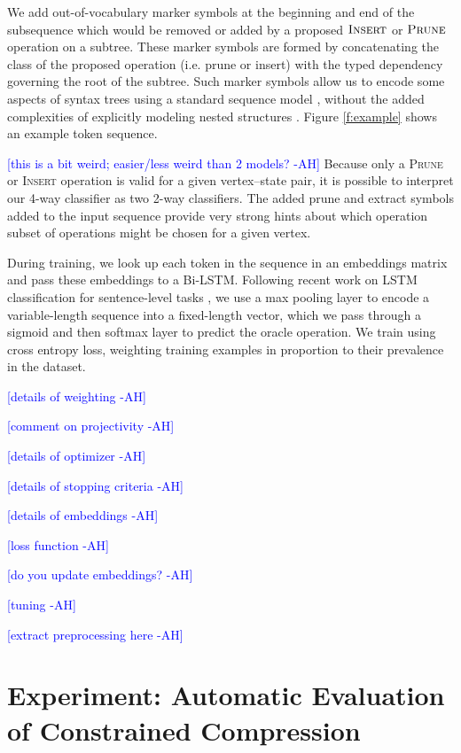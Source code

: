 \documentclass[11pt,a4paper]{article}
\newcommand{\ahcomment}[1]{\textcolor{blue}{[#1 -AH]}}
\begin{document}
We add out-of-vocabulary marker symbols at the beginning and end of the subsequence which would be removed or added by a proposed $\textsc{Insert}$ or $\textsc{Prune}$ operation on a subtree. These marker symbols are formed by concatenating the class of the proposed operation (i.e. prune or insert) with the typed dependency governing the root of the subtree. Such marker symbols allow us to encode some aspects of syntax trees using a standard sequence model \cite{Aharoni2017TowardsSN}, without the added complexities of explicitly modeling nested structures \cite{Tai2015ImprovedSR,Dyer2016RecurrentNN}. Figure \ref{f:example} shows an example token sequence. 

\ahcomment{this is a bit weird; easier/less weird than 2 models?} Because only a \textsc{Prune} or \textsc{Insert} operation is valid for a given vertex--state pair, it is possible to interpret our 4-way classifier as two 2-way classifiers. The added prune and extract symbols added to the input sequence provide very strong hints about which operation subset of operations might be chosen for a given vertex. 

During training, we look up each token in the sequence in an embeddings matrix and pass these embeddings to a Bi-LSTM. Following recent work on LSTM classification for sentence-level tasks \cite{D17-1070}, we use a max pooling layer to encode a variable-length sequence into a fixed-length vector, which we pass through a sigmoid and then softmax layer to predict the oracle operation. We train using cross entropy loss, weighting training examples in proportion to their prevalence in the dataset. 


\ahcomment{details of weighting}

\ahcomment{comment on projectivity}

\ahcomment{details of optimizer}

\ahcomment{details of stopping criteria}

\ahcomment{details of embeddings}

\ahcomment{loss function}

\ahcomment{do you update embeddings?}

\ahcomment{tuning}

\ahcomment{extract preprocessing here}




\section{Experiment: Automatic Evaluation of Constrained Compression}
\end{document}
